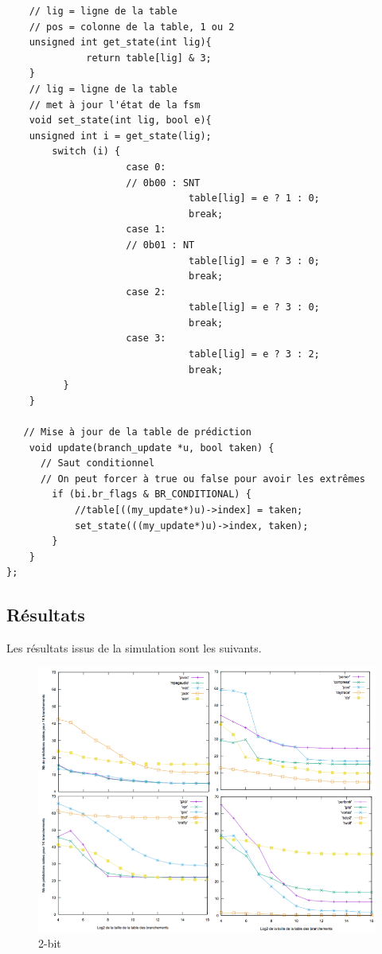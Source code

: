 \documentclass[a4paper]{article}
\begin{document}
\begin{verbatim}
    // lig = ligne de la table 
    // pos = colonne de la table, 1 ou 2
    unsigned int get_state(int lig){
              return table[lig] & 3;
    }
    // lig = ligne de la table 
    // met à jour l'état de la fsm
    void set_state(int lig, bool e){
    unsigned int i = get_state(lig);
        switch (i) {
                     case 0:
                     // 0b00 : SNT
                                table[lig] = e ? 1 : 0;
                                break;
                     case 1:
                     // 0b01 : NT
                                table[lig] = e ? 3 : 0;
                                break;
                     case 2:
                                table[lig] = e ? 3 : 0;
                                break;
                     case 3:
                                table[lig] = e ? 3 : 2;
                                break;
          } 
    }

   // Mise à jour de la table de prédiction
    void update(branch_update *u, bool taken) {
      // Saut conditionnel
      // On peut forcer à true ou false pour avoir les extrêmes
        if (bi.br_flags & BR_CONDITIONAL) {
            //table[((my_update*)u)->index] = taken;
            set_state(((my_update*)u)->index, taken);
        }
    }
};

\end{verbatim}
\normalsize

\subsection{Résultats}

Les résultats issus de la simulation sont les suivants.
\begin{figure}[t]
\includegraphics[width=\linewidth]{2-bit.png}
\caption{2-bit}
\centering
\end{figure}
\end{document}
